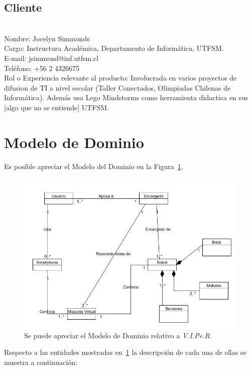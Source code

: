 \documentclass[letterpaper,12pt]{article} %
\numberwithin{equation}{section} %
\numberwithin{figure}{section} %
\numberwithin{table}{section} %
\begin{document}
\subsection{Cliente}
~\\
Nombre: Jocelyn Simmonds\\
Cargo: Instructura Acad\'emica, Departamento de Inform\'atica, UTFSM.\\
E-mail: jsimmond@inf.utfsm.cl\\
Tel\'efono: +56 2 4326675\\
Rol o Experiencia relevante al producto: Involucrada en varios proyectos de difusion de TI a nivel escolar (Taller Conectados, Olimpiadas Chilenas de Inform\'atica). Adem\'as usa Lego Mindstorms como herramienta didactica en sus [algo que no se entiende] UTFSM.

\newpage
\section{Modelo de Dominio}

Es posible apreciar el Modelo del Dominio en la Figura~\ref{fig:ModeloDominio}.

\begin{figure}[H]
   \centering
     \includegraphics[scale=0.45]{ModeloDominio.jpg}
   \caption{Se puede apreciar el Modelo de Dominio relativo a \emph{V.I.Pe.R}.}
   \label{fig:ModeloDominio}
\end{figure}

Respecto a las entidades mostradas en~\ref{fig:ModeloDominio} la descripci\'on de cada una de ellas se muestra a continuaci\'on:\\
\end{document}
